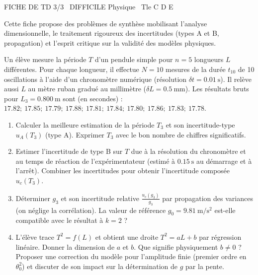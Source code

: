\documentclass[11pt]{article}
\begin{document}
\begin{tcolorbox}[enhanced,colback=popink,colframe=popink,arc=10pt,boxrule=0pt,left=12pt,right=12pt,top=9pt,bottom=9pt]
{\color{white}\popxbold\small FICHE DE TD 3/3 \textbullet\ DIFFICILE \hfill Physique \textbullet\ Tle C D E\par}
\end{tcolorbox}
\vspace{4pt}
Cette fiche propose des problèmes de synthèse mobilisant l'analyse dimensionnelle, le traitement rigoureux des incertitudes (types A et B, propagation) et l'esprit critique sur la validité des modèles physiques.

\begin{exercice}
Un élève mesure la période $T$ d'un pendule simple pour $n=5$ longueurs $L$ différentes. Pour chaque longueur, il effectue $N=10$ mesures de la durée $t_{10}$ de 10 oscillations à l'aide d'un chronomètre numérique (résolution $\delta t = \SI{0.01}{\second}$). Il relève aussi $L$ au mètre ruban gradué au millimètre ($\delta L = \SI{0.5}{\milli\meter}$). Les résultats bruts pour $L_3 = \SI{0.800}{\meter}$ sont (en secondes) :
$17.82;\ 17.85;\ 17.79;\ 17.88;\ 17.81;\ 17.84;\ 17.80;\ 17.86;\ 17.83;\ 17.78$.

\begin{enumerate}
    \item Calculer la meilleure estimation de la période $T_3$ et son incertitude-type $u_A(T_3)$ (type A). Exprimer $T_3$ avec le bon nombre de chiffres significatifs.
    \item Estimer l'incertitude de type B sur $T$ due à la résolution du chronomètre et au temps de réaction de l'expérimentateur (estimé à $\SI{0.15}{\second}$ au démarrage et à l'arrêt). Combiner les incertitudes pour obtenir l'incertitude composée $u_c(T_3)$.
    \item Déterminer $g_3$ et son incertitude relative $\frac{u_c(g_3)}{g_3}$ par propagation des variances (on néglige la corrélation). La valeur de référence $g_0 = \SI{9.81}{\meter\per\second\squared}$ est-elle compatible avec le résultat à $k=2$ ?
    \item L'élève trace $T^2 = f(L)$ et obtient une droite $T^2 = a L + b$ par régression linéaire. Donner la dimension de $a$ et $b$. Que signifie physiquement $b \neq 0$ ? Proposer une correction du modèle pour l'amplitude finie (premier ordre en $\theta_0^2$) et discuter de son impact sur la détermination de $g$ par la pente.
\end{enumerate}
\end{exercice}
\end{document}
